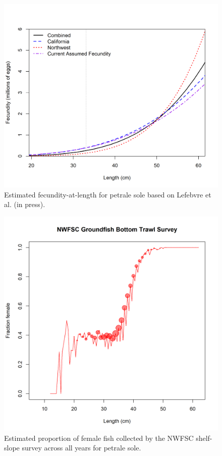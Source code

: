 \documentclass[12pt,]{article}
\begin{document}
\FloatBarrier

\begin{figure}
\centering
\includegraphics{Figures/fecundity.png}
\caption{Estimated fecundity-at-length for petrale sole based on
Lefebvre et al. (in press). \label{fig:fecundity}}
\end{figure}

\FloatBarrier

\begin{figure}
\centering
\includegraphics{Figures/NWFSC Groundfish Bottom Trawl Survey_length_fraction_female.png}
\caption{Estimated proportion of female fish collected by the NWFSC
shelf-slope survey across all years for petrale sole.
\label{fig:sex_ratio}}
\end{figure}
\end{document}
